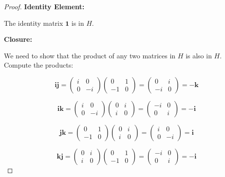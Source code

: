 \documentclass{article}
\begin{document}
\begin{proof}
    \textbf{Identity Element:}

The identity matrix \(\mathbf{1}\) is in \( H \).

\textbf{Closure:}

We need to show that the product of any two matrices in \( H \) is also in \( H \). Compute the products:

\[
\mathbf{i} \mathbf{j} = \begin{pmatrix} i & 0 \\ 0 & -i \end{pmatrix} \begin{pmatrix} 0 & 1 \\ -1 & 0 \end{pmatrix} = \begin{pmatrix} 0 & i \\ -i & 0 \end{pmatrix} = -\mathbf{k}
\]

\[
\mathbf{i} \mathbf{k} = \begin{pmatrix} i & 0 \\ 0 & -i \end{pmatrix} \begin{pmatrix} 0 & i \\ i & 0 \end{pmatrix} = \begin{pmatrix} -i & 0 \\ 0 & i \end{pmatrix} = -\mathbf{i}
\]

\[
\mathbf{j} \mathbf{k} = \begin{pmatrix} 0 & 1 \\ -1 & 0 \end{pmatrix} \begin{pmatrix} 0 & i \\ i & 0 \end{pmatrix} = \begin{pmatrix} i & 0 \\ 0 & -i \end{pmatrix} = \mathbf{i}
\]

\[
\mathbf{k} \mathbf{j} = \begin{pmatrix} 0 & i \\ i & 0 \end{pmatrix} \begin{pmatrix} 0 & 1 \\ -1 & 0 \end{pmatrix} = \begin{pmatrix} -i & 0 \\ 0 & i \end{pmatrix} = -\mathbf{i}
\]


\end{proof}
\end{document}
